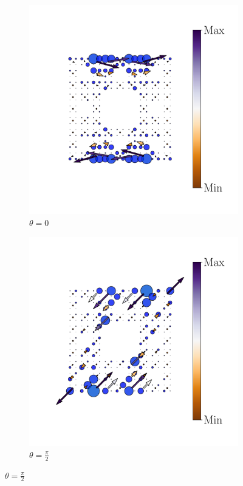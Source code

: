 \begin{figure}[tbh!]
\begin{minipage}[h!]{1.0\textwidth}
\begin{subfigure}[b!]{0.2 \textwidth}
         \end{subfigure}\hspace*{-0.5em}
          \begin{subfigure}[b!]{0.2 \textwidth}
             \caption*{$\theta = 0$}
             \includegraphics[width=\textwidth]{Imagenes/Resultados_pump_Fractal/x/hoti_pomp_x_neg3.pdf}
         \end{subfigure}\hspace*{-0.5em}
          \begin{subfigure}[b!]{0.2 \textwidth}
             \caption*{$\theta = \frac{\pi}{2}$}
             \includegraphics[width=\textwidth]{Imagenes/Resultados_pump_Fractal/x/hoti_pomp_x_neg4.pdf}

\end{subfigure}
\end{minipage}
\end{figure}
